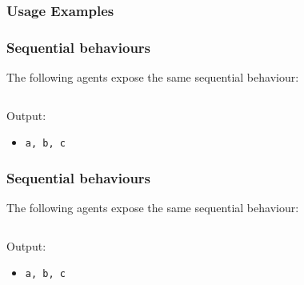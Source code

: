 \documentclass[presentation]{beamer}\mode<presentation>{\usetheme{AMSCesenaPurpleAndGold}}
\begin{document}
\subsubsection{Usage Examples}

\begin{frame}%
    \frametitle{Sequential behaviours}

    The following agents expose the same sequential behaviour:

    \vfill

    \begin{columns}
        \begin{column}{.48\linewidth}
            
        \end{column}
        \begin{column}{.48\linewidth}
            
        \end{column}
    \end{columns}

    \vfill

    Output:
    \begin{itemize}
        \item \texttt{a, b, c}
    \end{itemize}

\end{frame}

\begin{frame}%
    \frametitle{Sequential behaviours}

    The following agents expose the same sequential behaviour:

    \vfill

    \begin{columns}
        \begin{column}{.48\linewidth}
            
        \end{column}
        \begin{column}{.48\linewidth}
            
        \end{column}
    \end{columns}

    \vfill

    Output:
    \begin{itemize}
        \item \texttt{a, b, c}
    \end{itemize}

\end{frame}
\end{document}

